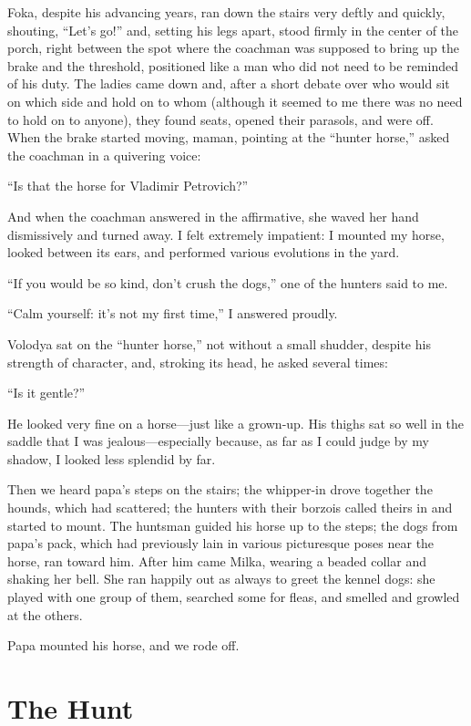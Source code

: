 Foka, despite his advancing years, ran down the stairs very deftly and quickly, shouting, ``Let's go!'' and, setting his legs apart, stood firmly in the center of the porch, right between the spot where the coachman was supposed to bring up the brake and the threshold, positioned like a man who did not need to be reminded of his duty. The ladies came down and, after a short debate over who would sit on which side and hold on to whom (although it seemed to me there was no need to hold on to anyone), they found seats, opened their parasols, and were off. When the brake started moving, maman, pointing at the ``hunter horse,'' asked the coachman in a quivering voice:

``Is that the horse for Vladimir Petrovich?'' %

And when the coachman answered in the affirmative, she waved her hand dismissively and turned away. I felt extremely impatient: I mounted my horse, looked between its ears, and performed various evolutions in the yard.

``If you would be so kind, don't crush the dogs,'' one of the hunters said to me. %

``Calm yourself: it's not my first time,'' I answered proudly. %

Volodya sat on the ``hunter horse,'' not without a small shudder, despite his strength of character, and, stroking its head, he asked several times:

``Is it gentle?'' %

He looked very fine on a horse---just like a grown-up. His thighs sat so well in the saddle that I was jealous---especially because, as far as I could judge by my shadow, I looked less splendid by far.

Then we heard papa's steps on the stairs; the whipper-in drove together the hounds, which had scattered; the hunters with their borzois called theirs in and started to mount. The huntsman guided his horse up to the steps; the dogs from papa's pack, which had previously lain in various picturesque poses near the horse, ran toward him. After him came Milka, wearing a beaded collar and shaking her bell. She ran happily out as always to greet the kennel dogs: she played with one group of them, searched some for fleas, and smelled and growled at the others.

Papa mounted his horse, and we rode off.

\chapter{The Hunt}

